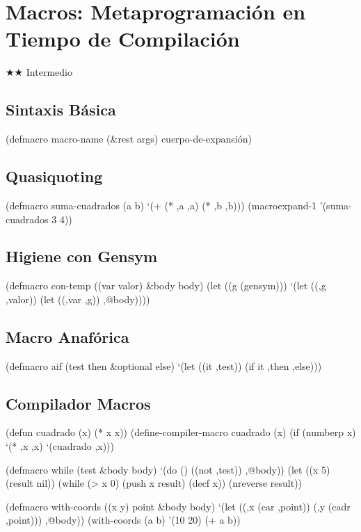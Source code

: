 \chapter{Macros: Metaprogramación en Tiempo de Compilación}
\label{chap:macros}
{\huge$\bigstar$}{\huge$\bigstar$} Intermedio

\section{Sintaxis Básica}
\begin{lispcode}
(defmacro macro-name (&rest args) cuerpo-de-expansión)
\end{lispcode}

\section{Quasiquoting}
\begin{lispcode}
(defmacro suma-cuadrados (a b) `(+ (* ,a ,a) (* ,b ,b)))
(macroexpand-1 '(suma-cuadrados 3 4))
\end{lispcode}

\section{Higiene con Gensym}
\begin{lispcode}
(defmacro con-temp ((var valor) &body body)
  (let ((g (gensym)))
    `(let ((,g ,valor)) (let ((,var ,g)) ,@body))))
\end{lispcode}

\section{Macro Anafórica}
\begin{lispcode}
(defmacro aif (test then &optional else)
  `(let ((it ,test)) (if it ,then ,else)))
\end{lispcode}

\section{Compilador Macros}
\begin{lispcode}
(defun cuadrado (x) (* x x))
(define-compiler-macro cuadrado (x)
  (if (numberp x) `(* ,x ,x) `(cuadrado ,x)))
\end{lispcode}

\begin{examplebox}[title=Macro while personalizada]
\begin{lispcode}
(defmacro while (test &body body)
  `(do () ((not ,test)) ,@body))
(let ((x 5) (result nil))
  (while (> x 0) (push x result) (decf x))
  (nreverse result))
\end{lispcode}
\end{examplebox}

\begin{examplebox}[title=Destructuring con with-coords]
\begin{lispcode}
(defmacro with-coords ((x y) point &body body)
  `(let ((,x (car ,point)) (,y (cadr ,point))) ,@body))
(with-coords (a b) '(10 20) (+ a b))
\end{lispcode}
\end{examplebox}

